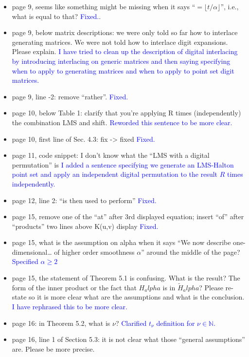 \documentclass{article}
\newcommand{\response}[1]{{\newline \textcolor{blue}{#1}}}
\newcommand{\fixed}{\response{Fixed.}}
\begin{document}
\begin{itemize}
    \response{I have now clarified this in Section 3 after introducing componenent-wise modulo.} 
    \item page 9, seems like something might be missing when it says “$=\lfloor t/\alpha \rfloor$”, i.e., what is equal to that?
    \fixed. 
    \item page 9, below matrix descriptions: we were only told so far how to interlace generating matrices. We were not told how to interlace digit expansions. Please explain.
    \response{I have tried to clean up the description of digital interlacing by introducing interlacing on generic matrices  and then saying specifying when to apply to generating matrices and when to apply to point set digit matrices.} 
    \item page 9, line -2: remove “rather”.
    \fixed
    \item page 10, below Table 1: clarify that you’re applying R times (independently) the combination LMS and shift.
    \response{Reworded this sentence to be more clear.}
    \item page 10, first line of Sec. 4.3: fix -> fixed
    \fixed
    \item page 11, code snippet: I don’t know what the “LMS with a digital permutation” is
    \response{I added a sentence specifying we generate an LMS-Halton point set and apply an independent digital permutation to the result $R$ times independently.}
    \item page 12, line 2: “is then used to perform”
    \fixed
    \item page 15, remove one of the “at” after 3rd displayed equation; insert “of” after “products” two lines above K(u,v) display
    \fixed
    \item page 15, what is the assumption on alpha when it says “We now describe one-dimensional… of higher order smoothness $\alpha$” around the middle of the page?
    \response{Specified $\alpha \geq 2$}
    \item page 15, the statement of Theorem 5.1 is confusing. What is the result? The form of the inner product or the fact that $H_alpha$ is in $\tilde{H}_alpha$? Please re-state so it is more clear what are the assumptions and what is the conclusion.
    \response{I have rephrased this to be more clear.}
    \item page 16: in Theorem 5.2, what is $\nu$?
    \response{Clarified $t_\nu$ definition for $\nu \in \mathbb{N}$.}
    \item page 16, line 1 of Section 5.3: it is not clear what those “general assumptions” are. Please be more precise.

\end{itemize}
\end{document}
